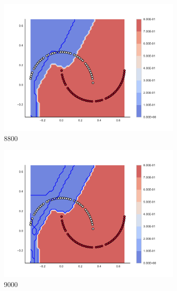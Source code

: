 \begin{figure}[h]
\begin{subfigure}[b]{0.09\textwidth}
    \includegraphics[clip, trim=2.35cm 1.75cm 4.5cm 0cm,width=\textwidth]{img/convergence/8800.pdf}
    \caption{8800}
    \label{fig:convergence_8800}
\end{subfigure}
%
\begin{subfigure}[b]{0.09\textwidth}
    \includegraphics[clip, trim=2.35cm 1.75cm 4.5cm 0cm,width=\textwidth]{img/convergence/9000.pdf}
    \caption{9000}
    \label{fig:convergence_9000}
\end{subfigure}
%
\begin{subfigure}[b]{0.09\textwidth}

\end{subfigure}
\end{figure}

